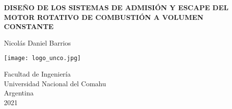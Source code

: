 \begin{titlepage}
    \begin{center}

        \vspace*{2cm}
        \huge
        \MakeUppercase{\textbf{Diseño de los sistemas de admisión y escape del
        Motor Rotativo de Combustión a Volumen Constante }}

        \vspace{0.8cm}
        Nicolás Daniel Barrios
        \vfill

        \vspace{0.8cm}
        \texttt{[image: logo\_unco.jpg]}
        \vspace{0.8cm}


        \large
        Facultad de Ingeniería \\
        Universidad Nacional del Comahu \\
        Argentina \\
        2021
    \end{center}
\end{titlepage}

